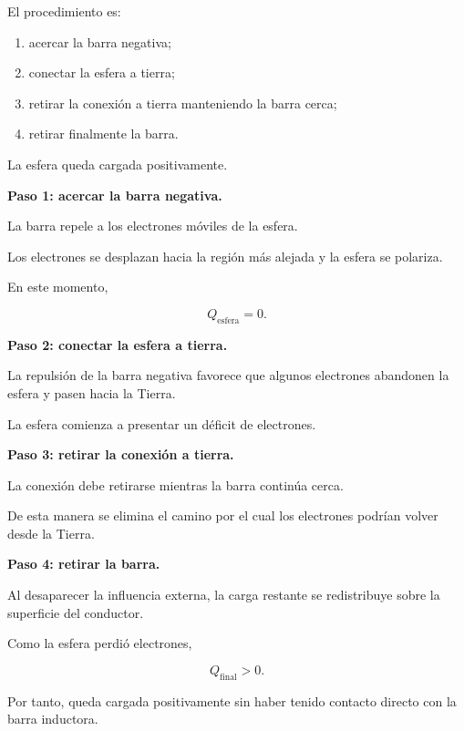 \begin{respuesta}

El procedimiento es:

\begin{enumerate}
    \item acercar la barra negativa;
    \item conectar la esfera a tierra;
    \item retirar la conexión a tierra manteniendo la barra cerca;
    \item retirar finalmente la barra.
\end{enumerate}

La esfera queda cargada positivamente.

\end{respuesta}

\begin{explicacion}

\textbf{Paso 1: acercar la barra negativa.}

La barra repele a los electrones móviles de la esfera.

Los electrones se desplazan hacia la región más alejada y la esfera se
polariza.

En este momento,

\[
Q_{\text{esfera}}=0.
\]

\textbf{Paso 2: conectar la esfera a tierra.}

La repulsión de la barra negativa favorece que algunos electrones abandonen
la esfera y pasen hacia la Tierra.

La esfera comienza a presentar un déficit de electrones.

\textbf{Paso 3: retirar la conexión a tierra.}

La conexión debe retirarse mientras la barra continúa cerca.

De esta manera se elimina el camino por el cual los electrones podrían volver
desde la Tierra.

\textbf{Paso 4: retirar la barra.}

Al desaparecer la influencia externa, la carga restante se redistribuye
sobre la superficie del conductor.

Como la esfera perdió electrones,

\[
\boxed{
Q_{\text{final}}>0
}.
\]

Por tanto, queda cargada positivamente sin haber tenido contacto directo con
la barra inductora.

\end{explicacion}